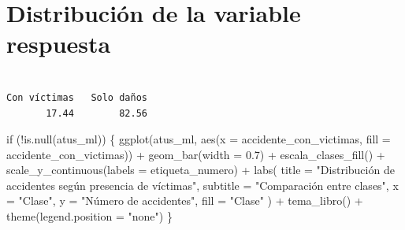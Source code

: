 \documentclass[
  spanish,
  10.5pt,
  letterpaper,
  openany,
  headings=big]{scrbook}
\newenvironment{Shaded}{}{}
\newcommand{\AttributeTok}[1]{\textcolor[rgb]{0.84,0.23,0.29}{#1}}
\newcommand{\ControlFlowTok}[1]{\textcolor[rgb]{0.84,0.23,0.29}{#1}}
\newcommand{\DecValTok}[1]{\textcolor[rgb]{0.00,0.36,0.77}{#1}}
\newcommand{\FloatTok}[1]{\textcolor[rgb]{0.00,0.36,0.77}{#1}}
\newcommand{\FunctionTok}[1]{\textcolor[rgb]{0.44,0.26,0.76}{#1}}
\newcommand{\NormalTok}[1]{\textcolor[rgb]{0.14,0.16,0.18}{#1}}
\newcommand{\OtherTok}[1]{\textcolor[rgb]{0.44,0.26,0.76}{#1}}
\newcommand{\SpecialCharTok}[1]{\textcolor[rgb]{0.00,0.36,0.77}{#1}}
\newcommand{\StringTok}[1]{\textcolor[rgb]{0.01,0.18,0.38}{#1}}
\newcounter{none} %
\begin{document}
\section{Distribución de la variable
respuesta}\label{distribuciuxf3n-de-la-variable-respuesta}

\begin{Shaded}
\end{Shaded}

\begin{verbatim}

Con víctimas   Solo daños 
       17.44        82.56 
\end{verbatim}

\begin{Shaded}
\begin{Highlighting}[]
\ControlFlowTok{if}\NormalTok{ (}\SpecialCharTok{!}\FunctionTok{is.null}\NormalTok{(atus\_ml)) \{}
  \FunctionTok{ggplot}\NormalTok{(atus\_ml, }\FunctionTok{aes}\NormalTok{(}\AttributeTok{x =}\NormalTok{ accidente\_con\_victimas, }\AttributeTok{fill =}\NormalTok{ accidente\_con\_victimas)) }\SpecialCharTok{+}
    \FunctionTok{geom\_bar}\NormalTok{(}\AttributeTok{width =} \FloatTok{0.7}\NormalTok{) }\SpecialCharTok{+}
    \FunctionTok{escala\_clases\_fill}\NormalTok{() }\SpecialCharTok{+}
    \FunctionTok{scale\_y\_continuous}\NormalTok{(}\AttributeTok{labels =}\NormalTok{ etiqueta\_numero) }\SpecialCharTok{+}
    \FunctionTok{labs}\NormalTok{(}
      \AttributeTok{title =} \StringTok{"Distribución de accidentes según presencia de víctimas"}\NormalTok{,}
      \AttributeTok{subtitle =} \StringTok{"Comparación entre clases"}\NormalTok{,}
      \AttributeTok{x =} \StringTok{"Clase"}\NormalTok{,}
      \AttributeTok{y =} \StringTok{"Número de accidentes"}\NormalTok{,}
      \AttributeTok{fill =} \StringTok{"Clase"}
\NormalTok{    ) }\SpecialCharTok{+}
    \FunctionTok{tema\_libro}\NormalTok{() }\SpecialCharTok{+}
    \FunctionTok{theme}\NormalTok{(}\AttributeTok{legend.position =} \StringTok{"none"}\NormalTok{)}
\NormalTok{\}}
\end{Highlighting}
\end{Shaded}
\end{document}
